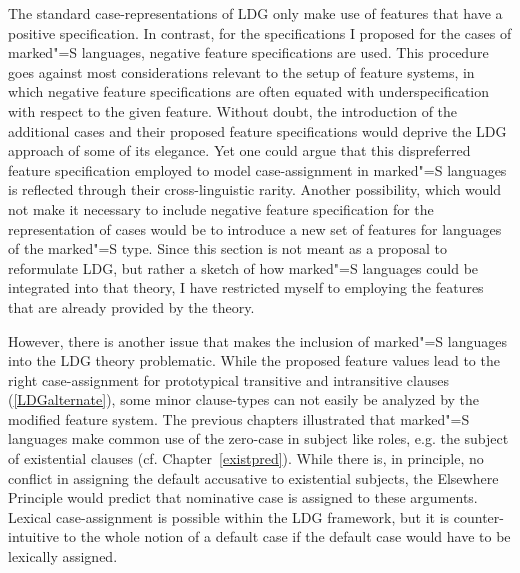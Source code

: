 The standard case-representations of LDG only make use of features that have a positive specification. 
In contrast, for the specifications I proposed for the cases of marked"=S languages, negative feature specifications are used. 
This procedure goes against most considerations relevant to the setup of feature systems, in which negative feature specifications are often equated with underspecification with respect to the given feature.
Without doubt, the introduction of the additional cases and their proposed feature specifications would deprive the LDG approach of some of its elegance.
Yet one could argue that this dispreferred feature specification employed to model case-assignment in marked"=S languages is reflected through their cross-linguistic rarity.   
Another possibility, which would not make it necessary to include negative feature specification for the representation of cases would be to introduce a new set of features for languages of the marked"=S type. 
Since this section is not meant as a proposal to reformulate LDG, but rather a sketch of how marked"=S languages could be integrated into that theory, I have restricted myself to employing the features that are already provided by the theory. 

However, there is another issue that makes the inclusion of marked"=S languages into the LDG theory problematic.
While the proposed feature values lead to the right case-assignment for prototypical transitive and intransitive clauses (\ref{LDGalternate}), some minor clause-types can not easily be analyzed by the modified feature system.
The previous chapters illustrated that marked"=S languages make common use of the zero-case in subject like roles, e.g. the subject of existential clauses (cf. Chapter~\ref{existpred}). 
While there is, in principle, no conflict in assigning the default accusative to existential subjects, the Elsewhere Principle would predict that nominative case is assigned to these arguments. 
Lexical case-assignment is possible within the LDG framework, but it is counter-intuitive to the whole notion of a default case if the default case would have to be lexically assigned. 

